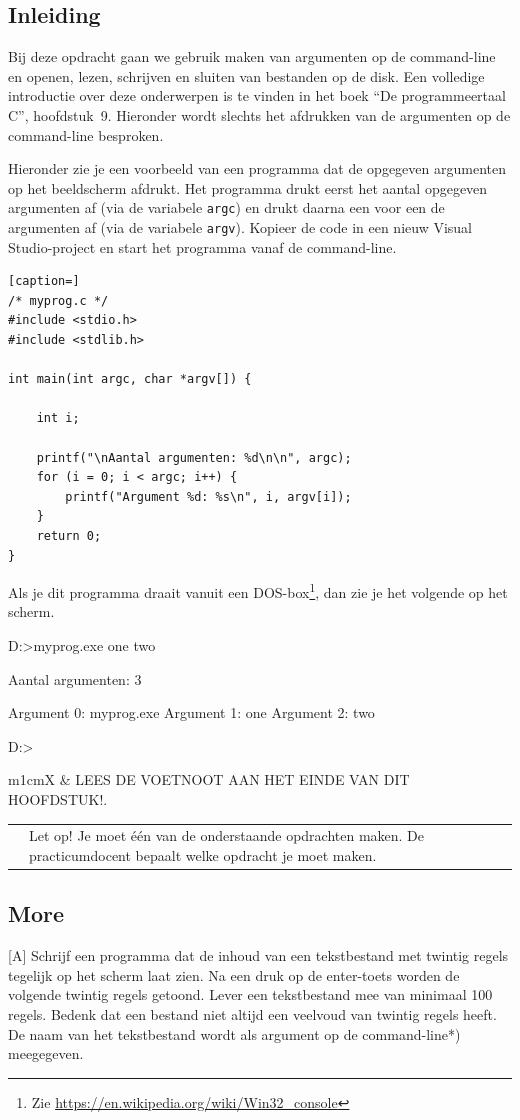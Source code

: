 \documentclass[a4paper,10pt,fleqn,twoside]{article}
\newcommand{\letopeen}{%
\vspace{4ex plus 1ex minus 1ex}
\begin{mdframed}[outerlinewidth = 1 ,%
roundcorner = 4 pt,%
leftmargin = 40,%
rightmargin = 40,%
backgroundcolor = yellow!40,%
outerlinecolor = red!70!black,%
innertopmargin = \topskip,%
splittopskip = \topskip,%
]
\begin{tabularx}{\linewidth}{m{1cm}X}
\Large\leftpointright & Let op! Je moet \'e\'en van de onderstaande opdrachten maken. De practicumdocent bepaalt welke opdracht je moet maken.
\end{tabularx}
\end{mdframed}
\vspace{4ex plus 1ex minus 1ex}
}
\newcommand{\leesvoetnoot}{%
\vspace{4ex plus 1ex minus 1ex}
\begin{mdframed}[outerlinewidth = 1 ,%
roundcorner = 4 pt,%
leftmargin = 40,%
rightmargin = 40,%
backgroundcolor = yellow!40,%
outerlinecolor = red!70!black,%
innertopmargin = \topskip,%
splittopskip = \topskip,%
]
\begin{tabularx}{\linewidth}{m{1cm}X}
\Large\leftpointright & LEES DE VOETNOOT AAN HET EINDE VAN DIT HOOFDSTUK!.
\end{tabularx}
\end{mdframed}
\vspace{4ex plus 1ex minus 1ex}
}
\begin{document}
\subsection{Inleiding}
Bij deze opdracht gaan we gebruik maken van argumenten op de command-line en openen, lezen, schrijven en sluiten van bestanden op de disk. Een volledige introductie over deze onderwerpen is te vinden in het boek ``De programmeertaal C'', hoofdstuk~9. Hieronder wordt slechts het afdrukken van de argumenten op de command-line besproken.

Hieronder zie je een voorbeeld van een programma dat de opgegeven argumenten op het beeldscherm afdrukt. Het programma drukt eerst het aantal opgegeven argumenten af (via de variabele \lstinline|argc|) en drukt daarna een voor een de argumenten af (via de variabele \lstinline|argv|).
Kopieer de code in een nieuw Visual Studio-project en start het programma vanaf de command-line.

\begin{lstlisting}[caption=]
/* myprog.c */
#include <stdio.h>
#include <stdlib.h>

int main(int argc, char *argv[]) {

    int i;

    printf("\nAantal argumenten: %d\n\n", argc);
    for (i = 0; i < argc; i++) {
        printf("Argument %d: %s\n", i, argv[i]);
    }
    return 0;
}
\end{lstlisting}

Als je dit programma draait vanuit een DOS-box\footnote{Zie \url{https://en.wikipedia.org/wiki/Win32_console}}, dan zie je het volgende op het scherm.

\begin{dosbox}
D:\PROJECTS\VS\myprog\Debug>myprog.exe one two

Aantal argumenten: 3

Argument 0: myprog.exe
Argument 1: one
Argument 2: two

D:\PROJECTS\VS\myprog\Debug>
\end{dosbox}

\leesvoetnoot
\letopeen
\clearpage

\subsection{More}[A]
Schrijf een programma dat de inhoud van een tekstbestand met twintig regels tegelijk op het scherm laat zien. Na een druk op de enter-toets worden de volgende twintig regels getoond. Lever een tekstbestand mee van minimaal 100 regels. Bedenk dat een bestand niet altijd een veelvoud van twintig regels heeft. De naam van het tekstbestand wordt als argument op de command-line*) meegegeven.
\end{document}
